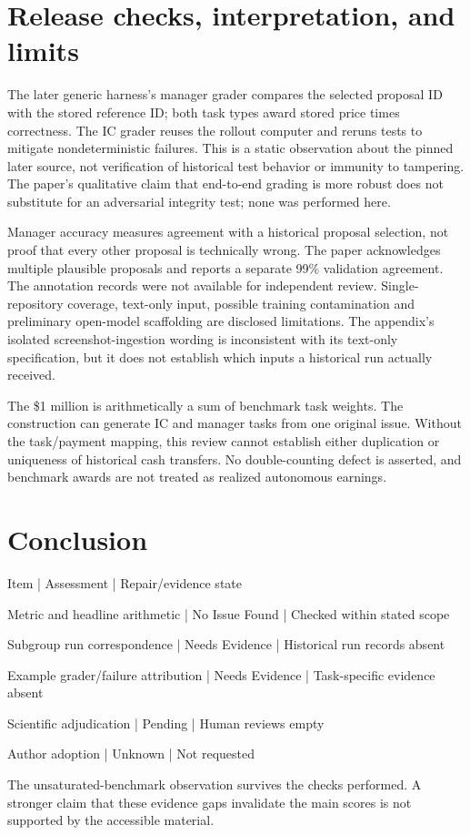 \documentclass[10pt]{article}
\begin{document}
\section*{Release checks, interpretation, and limits}
The later generic harness’s manager grader compares the selected proposal ID with the stored reference ID; both task types award stored price times correctness. The IC grader reuses the rollout computer and reruns tests to mitigate nondeterministic failures. This is a static observation about the pinned later source, not verification of historical test behavior or immunity to tampering. The paper’s qualitative claim that end-to-end grading is more robust does not substitute for an adversarial integrity test; none was performed here.\par
Manager accuracy measures agreement with a historical proposal selection, not proof that every other proposal is technically wrong. The paper acknowledges multiple plausible proposals and reports a separate 99\% validation agreement. The annotation records were not available for independent review. Single-repository coverage, text-only input, possible training contamination and preliminary open-model scaffolding are disclosed limitations. The appendix’s isolated screenshot-ingestion wording is inconsistent with its text-only specification, but it does not establish which inputs a historical run actually received.\par
The \$1 million is arithmetically a sum of benchmark task weights. The construction can generate IC and manager tasks from one original issue. Without the task/payment mapping, this review cannot establish either duplication or uniqueness of historical cash transfers. No double-counting defect is asserted, and benchmark awards are not treated as realized autonomous earnings.\par
\section*{Conclusion}
Item | Assessment | Repair/evidence state\par
Metric and headline arithmetic | No Issue Found | Checked within stated scope\par
Subgroup run correspondence | Needs Evidence | Historical run records absent\par
Example grader/failure attribution | Needs Evidence | Task-specific evidence absent\par
Scientific adjudication | Pending | Human reviews empty\par
Author adoption | Unknown | Not requested\par
The unsaturated-benchmark observation survives the checks performed. A stronger claim that these evidence gaps invalidate the main scores is not supported by the accessible material.\par
\end{document}

